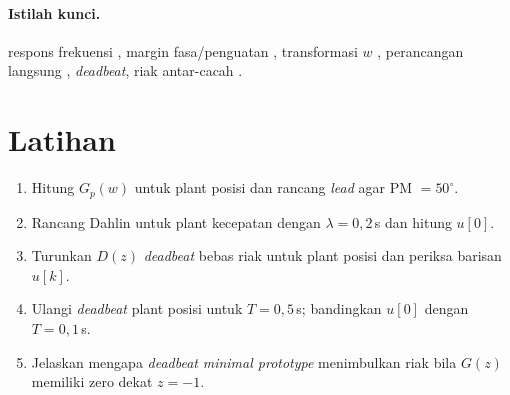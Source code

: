 \paragraph{Istilah kunci.} respons frekuensi , margin fasa/penguatan , transformasi $w$ , perancangan langsung , \textit{deadbeat}, riak antar-cacah .

\section*{Latihan}
\begin{enumerate}
	\item Hitung $G_p(w)$ untuk plant posisi dan rancang \textit{lead} agar PM $= 50^\circ$.
	\item Rancang Dahlin untuk plant kecepatan dengan $\lambda = 0{,}2$\,s dan hitung $u[0]$.
	\item Turunkan $D(z)$ \textit{deadbeat} bebas riak untuk plant posisi dan periksa barisan $u[k]$.
	\item Ulangi \textit{deadbeat} plant posisi untuk $T = 0{,}5$\,s; bandingkan $u[0]$ dengan $T = 0{,}1$\,s.
	\item Jelaskan mengapa \textit{deadbeat} \textit{minimal prototype} menimbulkan riak bila $G(z)$ memiliki zero dekat $z = -1$.
\end{enumerate}
